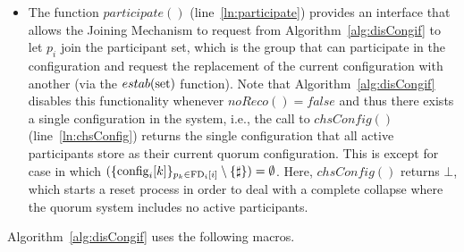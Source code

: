 \documentclass[11pt]{article}
\newcommand{\noReconfig}{noReco}
\newcommand{\configEstab}{estab}
\begin{document}
\begin{itemize}
\item The function $participate()$ (line~\ref{ln:participate}) provides an interface that allows the Joining Mechanism to request from Algorithm~\ref{alg:disCongif} to let $p_i$ join the participant set, which is the group that can participate in the configuration and request the replacement of the current configuration with another (via the $\configEstab(\textnormal{set})$ function). Note that Algorithm~\ref{alg:disCongif} disables this functionality whenever $\noReconfig()=false$ and thus there exists a single configuration in the system, i.e., the call to $chsConfig()$ (line~\ref{ln:chsConfig}) returns the single configuration that all active participants store as their current quorum configuration. This is except for case in which $(\{ \textnormal{config}_i[k] \}_{p_k \in \textnormal{FD}_i[i]} \setminus \{ \sharp \})=\emptyset$. Here, $chsConfig()$ returns $\bot$, which starts a reset process in order to deal with a complete collapse where the quorum system includes no active participants. 




\end{itemize}

Algorithm~\ref{alg:disCongif} uses the following macros. 
\end{document}
